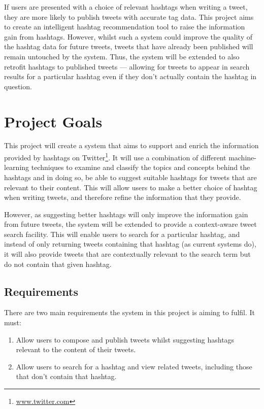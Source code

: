 \documentclass[12pt,a4paper]{article}
\begin{document}
If users are presented with a choice of relevant hashtags when writing a tweet, they are more likely to publish tweets with accurate tag data. This project aims to create an intelligent hashtag recommendation tool to raise the information gain from hashtags. However, whilst such a system could improve the quality of the hashtag data for future tweets, tweets that have already been published will remain untouched by the system. Thus, the system will be extended to also retrofit hashtags to published tweets --- allowing for tweets to appear in search results for a particular hashtag even if they don't actually contain the hashtag in question.
\pagebreak

\tableofcontents
\pagebreak

\section{Project Goals}
This project will create a system that aims to support and enrich the information provided by hashtags on Twitter\footnote{\url{www.twitter.com}}. It will use a combination of different machine-learning techniques to examine and classify the topics and concepts behind the hashtags and in doing so, be able to suggest suitable hashtags for tweets that are relevant to their content. This will allow users to make a better choice of hashtag when writing tweets, and therefore refine the information that they provide.

However, as suggesting better hashtags will only improve the information gain from future tweets, the system will be extended to provide a context-aware tweet search facility. This will enable users to search for a particular hashtag, and instead of only returning tweets containing that hashtag (as current systems do), it will also provide tweets that are contextually relevant to the search term but do not contain that given hashtag.

\subsection{Requirements}
There are two main requirements the system in this project is aiming to fulfil. It must:
\begin{enumerate}
    \item Allow users to compose and publish tweets whilst suggesting hashtags relevant to the content of their tweets.
    \item Allow users to search for a hashtag and view related tweets, including those that don't contain that hashtag.
\end{enumerate}
\end{document}
